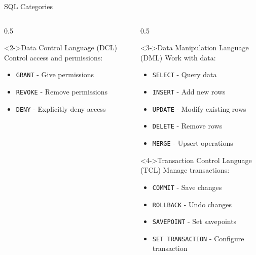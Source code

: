 \documentclass[aspectratio=169,11pt]{beamer}
\begin{document}
\begin{frame}{SQL Categories}
\begin{columns}[T]
\begin{column}{0.5\textwidth}

\pause
\begin{block}<2->{Data Control Language (DCL)}
Control access and permissions:
\begin{itemize}
    \item \texttt{GRANT} - Give permissions
    \item \texttt{REVOKE} - Remove permissions
    \item \texttt{DENY} - Explicitly deny access
\end{itemize}
\end{block}
\end{column}

\pause
\begin{column}{0.5\textwidth}
\begin{block}<3->{Data Manipulation Language (DML)}
Work with data:
\begin{itemize}
    \item \texttt{SELECT} - Query data
    \item \texttt{INSERT} - Add new rows
    \item \texttt{UPDATE} - Modify existing rows
    \item \texttt{DELETE} - Remove rows
    \item \texttt{MERGE} - Upsert operations
\end{itemize}
\end{block}

\pause
\begin{block}<4->{Transaction Control Language (TCL)}
Manage transactions:
\begin{itemize}
    \item \texttt{COMMIT} - Save changes
    \item \texttt{ROLLBACK} - Undo changes
    \item \texttt{SAVEPOINT} - Set savepoints
    \item \texttt{SET TRANSACTION} - Configure transaction
\end{itemize}
\end{block}
\end{column}
\end{columns}
\end{frame}
\end{document}
